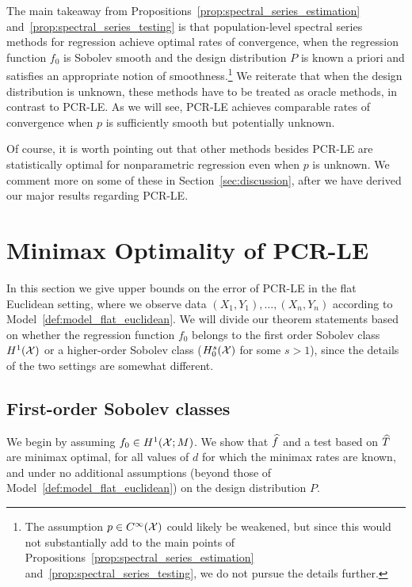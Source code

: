 The main takeaway from Propositions~\ref{prop:spectral_series_estimation} and~\ref{prop:spectral_series_testing} is that population-level spectral series methods for regression achieve optimal rates of convergence, when the regression function $f_0$ is Sobolev smooth and the design distribution $P$ is known a priori and satisfies an appropriate notion of smoothness.\footnote{The assumption $p \in C^{\infty}(\mathcal{X})$ could likely be weakened, but since this would not substantially add to the main points of Propositions~\ref{prop:spectral_series_estimation} and~\ref{prop:spectral_series_testing}, we do not pursue the details further.} We reiterate that when the design distribution is unknown, these methods have to be treated as oracle methods, in contrast to PCR-LE. As we will see, PCR-LE achieves comparable rates of convergence when $p$ is sufficiently smooth but potentially unknown.

Of course, it is worth pointing out that other methods besides PCR-LE are statistically optimal for nonparametric regression even when $p$ is unknown. We comment more on some of these in Section~\ref{sec:discussion}, after we have derived our major results regarding PCR-LE.

\section{Minimax Optimality of PCR-LE}
\label{sec:minimax_optimal_laplacian_eigenmaps}

In this section we give upper bounds on the error of PCR-LE in the flat Euclidean setting, where we observe data $(X_1,Y_1),\ldots,(X_n,Y_n)$ according to Model~\ref{def:model_flat_euclidean}. We will divide our theorem statements based on whether the regression function $f_0$ belongs to the first order Sobolev class $H^1(\mathcal{X})$ or a higher-order Sobolev class ($H_0^{s}(\mathcal{X})$ for some $s > 1$), since the details of the two settings are somewhat different.

\subsection{First-order Sobolev classes}
\label{sec:first_order_sobolev_classes}
We begin by assuming $f_0 \in H^1(\mathcal{X}; M)$. We show that $\widehat{f}$ and a test based on $\widehat{T}$ are minimax optimal, for all values of $d$ for which the minimax rates are known, and under no additional assumptions (beyond those of Model~\ref{def:model_flat_euclidean}) on the design distribution $P$.

